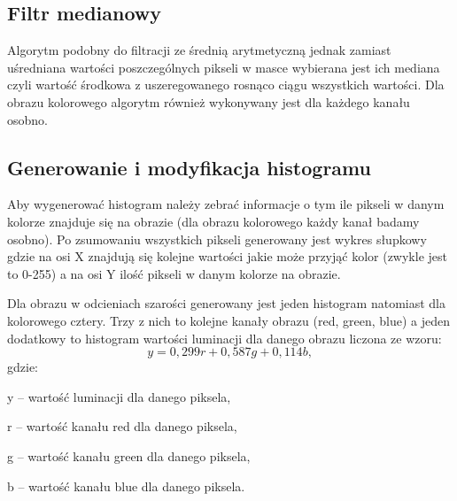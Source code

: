\documentclass{classrep}
\begin{document}
\subsection{Filtr medianowy}
Algorytm podobny do filtracji ze średnią arytmetyczną jednak zamiast uśredniana wartości poszczególnych pikseli w masce wybierana jest ich mediana czyli wartość środkowa z uszeregowanego rosnąco ciągu wszystkich wartości. Dla obrazu kolorowego algorytm również wykonywany jest dla każdego kanału osobno.

\subsection{Generowanie i modyfikacja histogramu}
Aby wygenerować histogram należy zebrać informacje o tym ile pikseli w danym kolorze znajduje się na obrazie (dla obrazu kolorowego każdy kanał badamy osobno). Po zsumowaniu wszystkich pikseli generowany jest wykres słupkowy gdzie na osi X znajdują się kolejne wartości jakie może przyjąć kolor (zwykle jest to 0-255) a na osi Y ilość pikseli w danym kolorze na obrazie.

Dla obrazu w odcieniach szarości generowany jest jeden histogram natomiast dla kolorowego cztery. Trzy z nich to kolejne kanały obrazu (red, green, blue) a jeden dodatkowy to histogram wartości luminacji dla danego obrazu liczona ze wzoru:
\begin{equation}
 y = 0,299r + 0,587g + 0,114b, \label{luminacja}
 \end{equation}
gdzie:
\begin{description}
\item y -- wartość luminacji dla danego piksela,
\item r -- wartość kanału red dla danego piksela,
\item g -- wartość kanału green dla danego piksela,
\item b -- wartość kanału blue dla danego piksela.
\end{description}
\end{document}
